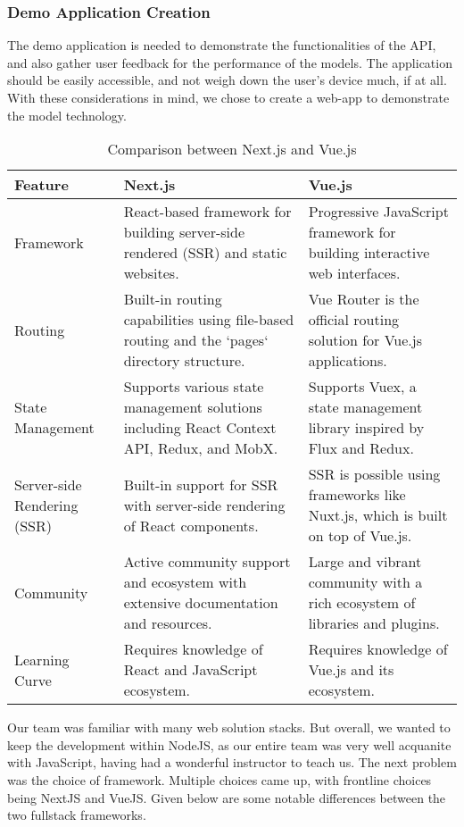 \subsubsection{Demo Application Creation}
The demo application is needed to demonstrate the functionalities of the API, and also gather user feedback for the performance of the models. The application should be easily accessible, and not weigh down the user's device much, if at all. With these considerations in mind, we chose to create a web-app to demonstrate the model technology.

\begin{table}[htbp]
    \centering
    \begin{tabular}{|l|p{}|p{}|}
    \hline
    \textbf{Feature} & \textbf{Next.js} & \textbf{Vue.js} \\
    \hline
    Framework & React-based framework for building server-side rendered (SSR) and static websites. & Progressive JavaScript framework for building interactive web interfaces. \\
    \hline
    Routing & Built-in routing capabilities using file-based routing and the `pages` directory structure. & Vue Router is the official routing solution for Vue.js applications. \\
    \hline
    State Management & Supports various state management solutions including React Context API, Redux, and MobX. & Supports Vuex, a state management library inspired by Flux and Redux. \\
    \hline
    Server-side Rendering (SSR) & Built-in support for SSR with server-side rendering of React components. & SSR is possible using frameworks like Nuxt.js, which is built on top of Vue.js. \\
    \hline
    Community & Active community support and ecosystem with extensive documentation and resources. & Large and vibrant community with a rich ecosystem of libraries and plugins. \\
    \hline
    Learning Curve & Requires knowledge of React and JavaScript ecosystem. & Requires knowledge of Vue.js and its ecosystem. \\
    \hline
    \end{tabular}
    \caption{Comparison between Next.js and Vue.js}
    \label{tab:nextjs-vs-vuejs}
    \end{table}

Our team was familiar with many web solution stacks. But overall, we wanted to keep the development within NodeJS, as our entire team was very well acquanite with JavaScript, having had a wonderful instructor to teach us. The next problem was the choice of framework. Multiple choices came up, with frontline choices being NextJS and VueJS. Given below are some notable differences between the two fullstack frameworks.

